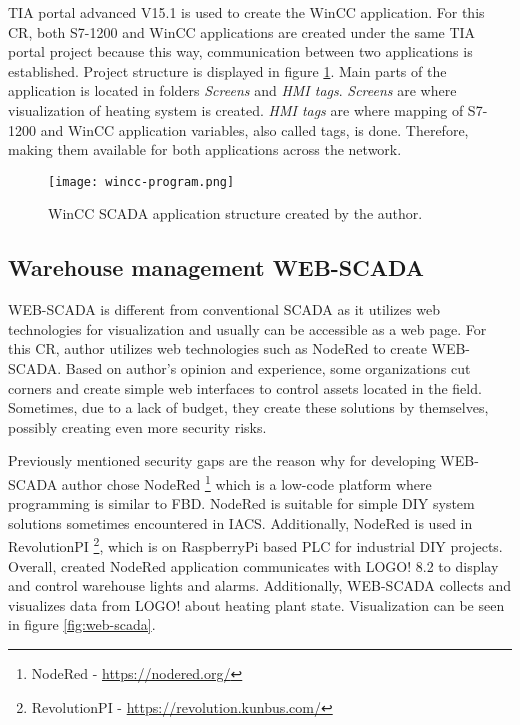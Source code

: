 TIA portal advanced V15.1 is used to create the WinCC application. For this CR, both S7-1200 and WinCC applications are created under the same TIA portal project because this way, communication between two applications is established. Project structure is displayed in figure \ref{fig:wincc-program}. Main parts of the application is located in folders \textit{Screens} and \textit{HMI tags}. \textit{Screens} are where visualization of heating system is created. \textit{HMI tags} are where mapping of S7-1200 and WinCC application variables, also called tags, is done. Therefore, making them available for both applications across the network. 

\begin{figure}[h]
	\centering
	\texttt{[image: wincc-program.png]}
	\caption{WinCC SCADA application structure created by the author.}
	\label{fig:wincc-program}
\end{figure}

\subsection{Warehouse management WEB-SCADA}

WEB-SCADA is different from conventional SCADA as it utilizes web technologies for visualization and usually can be accessible as a web page. For this CR, author utilizes web technologies such as NodeRed to create WEB-SCADA. Based on author's opinion and experience, some organizations cut corners and create simple web interfaces to control assets located in the field. Sometimes, due to a lack of budget, they create these solutions by themselves, possibly creating even more security risks. 

Previously mentioned security gaps are the reason why for developing WEB-SCADA author chose NodeRed \footnote{NodeRed - \url{https://nodered.org/}} which is a low-code platform where programming is similar to FBD. NodeRed is suitable for simple DIY system solutions sometimes encountered in IACS. Additionally, NodeRed is used in RevolutionPI \footnote{RevolutionPI - \url{https://revolution.kunbus.com/}}, which is on RaspberryPi based PLC for industrial DIY projects. Overall, created NodeRed application communicates with LOGO! 8.2 to display and control warehouse lights and alarms. Additionally, WEB-SCADA collects and visualizes data from LOGO! about heating plant state. Visualization can be seen in figure \ref{fig:web-scada}.

